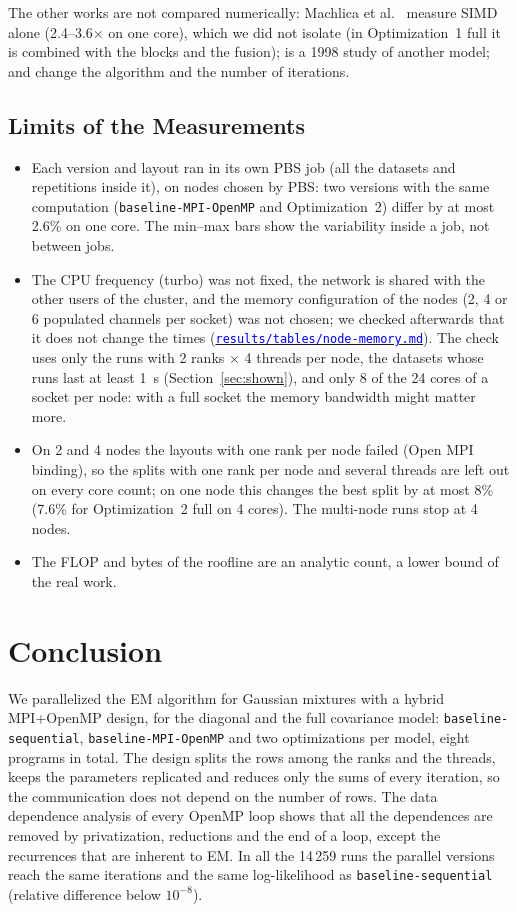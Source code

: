 \documentclass[conference,onecolumn]{IEEEtran}
\newcommand{\vseq}{\texttt{baseline-\allowbreak sequential}}
\newcommand{\vbase}{\texttt{baseline-\allowbreak MPI-\allowbreak OpenMP}}
\newcommand{\repolink}[1]{\href{https://github.com/HPC-2627/ParallelExpectationMaximizationClustering/tree/main/#1}{\textcolor{blue}{\nolinkurl{#1}}}}
\begin{document}
The other works are not compared numerically: Machlica et al.~\cite{machlica} measure SIMD alone (2.4--3.6$\times$ on one core), which we did not isolate (in Optimization~1 full it is combined with the blocks and the fusion); \cite{byu} is a 1998 study of another model; \cite{yin} and \cite{srivastava} change the algorithm and the number of iterations.

\subsection{Limits of the Measurements}
\begin{itemize}
\item Each version and layout ran in its own PBS job (all the datasets and repetitions inside it), on nodes chosen by PBS: two versions with the same computation (\vbase{} and Optimization~2) differ by at most 2.6\% on one core. The min--max bars show the variability inside a job, not between jobs.
\item The CPU frequency (turbo) was not fixed, the network is shared with the other users of the cluster, and the memory configuration of the nodes (2, 4 or 6 populated channels per socket) was not chosen; we checked afterwards that it does not change the times (\repolink{results/tables/node-memory.md}). The check uses only the runs with 2 ranks $\times$ 4 threads per node, the datasets whose runs last at least 1~s (Section~\ref{sec:shown}), and only 8 of the 24 cores of a socket per node: with a full socket the memory bandwidth might matter more.
\item On 2 and 4 nodes the layouts with one rank per node failed (Open MPI binding), so the splits with one rank per node and several threads are left out on every core count; on one node this changes the best split by at most 8\% (7.6\% for Optimization~2 full on 4 cores). The multi-node runs stop at 4 nodes.
\item The FLOP and bytes of the roofline are an analytic count, a lower bound of the real work.
\end{itemize}

\section{Conclusion}
We parallelized the EM algorithm for Gaussian mixtures with a hybrid MPI+OpenMP design, for the diagonal and the full covariance model: \vseq{}, \vbase{} and two optimizations per model, eight programs in total. The design splits the rows among the ranks and the threads, keeps the parameters replicated and reduces only the sums of every iteration, so the communication does not depend on the number of rows. The data dependence analysis of every OpenMP loop shows that all the dependences are removed by privatization, reductions and the end of a loop, except the recurrences that are inherent to EM. In all the 14\,259 runs the parallel versions reach the same iterations and the same log-likelihood as \vseq{} (relative difference below $10^{-8}$).
\end{document}
